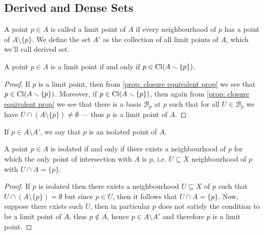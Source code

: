 \subsection{Derived and Dense Sets}

\begin{definition}
    \label{def:limit-point-derived-set}
    A point \(p \in A\) is called a limit point of \(A\) if every neighbourhood of
    \(p\) has a point of \(A \setminus \{p\}\). We define the set \(A'\) as the
    collection of all limit points of \(A\), which we'll call derived set.
\end{definition}

\begin{proposition}
    \label{prop:equivalent-def-limit-point}
    A point \(p \in A\) is a limit point if and only if \(p \in \operatorname{Cl}(A
    \smallsetminus \{p\})\).
\end{proposition}

\begin{proof}
    If \(p\) is a limit point, then from \cref{prop: closure equivalent prop} we see
    that \(p \in \operatorname{Cl}(A \smallsetminus \{p\})\). Moreover, if \(p \in \operatorname{Cl}(A
    \smallsetminus \{p\})\), then again from \cref{prop: closure equivalent prop} we
    see that there is a basis \(\mathcal{B}_p\) at \(p\) such that for all \(U \in
    \mathcal{B}_p\) we have \(U \cap (A \setminus \{p\}) \neq \emptyset\) --- thus
    \(p\) is a limit point of \(A\).
\end{proof}

\begin{definition}
    \label{def:isolated-points}
    If \(p \in A \setminus A'\), we say that \(p\) is an isolated point of \(A\).
\end{definition}

\begin{proposition}\label{prop:isolated-point-equivalent-def}
    A point \(p \in A\) is isolated if and only if there exists a neighbourhood of
    \(p\) for which the only point of intersection with \(A\) is \(p\), i.e. \(U
    \subseteq X\) neighbourhood of \(p\) with \(U \cap A = \{p\}\).
\end{proposition}

\begin{proof}
    If \(p\) is isolated then there exists a neighbourhood \(U \subseteq X\) of
    \(p\) such that \(U \cap (A \setminus \{p\}) = \emptyset\) but since \(p \in
    U\), then it follows that \(U \cap A = \{p\}\). Now, suppose there exists such
    \(U\), then in particular \(p\) does not satisfy the condition to be a limit
    point of \(A\), thus \(p \notin A\), hence \(p \in A \setminus A'\) and
    therefore \(p\) is a limit point.
\end{proof}

